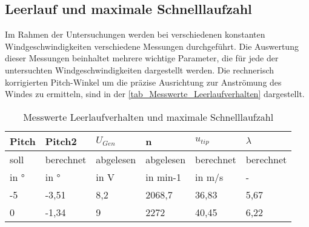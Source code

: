 \subsection{Leerlauf und maximale Schnelllaufzahl}
Im Rahmen der Untersuchungen werden bei verschiedenen konstanten Windgeschwindigkeiten verschiedene Messungen durchgeführt.
 Die Auswertung dieser Messungen beinhaltet mehrere wichtige Parameter, die für jede der untersuchten Windgeschwindigkeiten dargestellt werden.
 Die rechnerisch korrigierten Pitch-Winkel um die präzise Ausrichtung zur Anströmung des Windes zu ermitteln, sind in der \autoref{tab_Messwerte_Leerlaufverhalten} dargestellt.
\begin{table}[H]
    \centering
    \caption{Messwerte Leerlaufverhalten und maximale Schnelllaufzahl}
    \label{tab_Messwerte_Leerlaufverhalten}
    \small
    \begin{tabular}{|l|l|l|l|l|l|}
    \hline
    \rowcolor[HTML]{70AD47} 
    {\color[HTML]{FFFFFF} \textbf{Pitch}} & {\color[HTML]{FFFFFF} \textbf{Pitch2}} & {\color[HTML]{FFFFFF} \textbf{$U_{Gen}$}} & {\color[HTML]{FFFFFF} \textbf{n}} & {\color[HTML]{FFFFFF} \textbf{$u_{tip}$}} & {\color[HTML]{FFFFFF} \textbf{$\lambda$}} \\ \hline
    \rowcolor[HTML]{70AD47} 
    soll                                  & berechnet                              & abgelesen                                          & abgelesen                                & berechnet                                            & berechnet                                      \\ \hline
    \rowcolor[HTML]{70AD47} 
    in °                                  & in °                                   & in V                                               & in min-1                                 & in m/s                                               & -                                              \\ \hline
    \rowcolor[HTML]{C6E0B4} 
    -5                                    & -3,51                                  & 8,2                                                & 2068,7                                   & 36,83                                          & 5,67                                    \\ \hline
    \rowcolor[HTML]{E2EFDA} 
    0                                     & -1,34                                  & 9                                                  & 2272                                     & 40,45                                          & 6,22                                    \\ \hline

\end{tabular}
\end{table}
